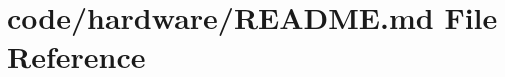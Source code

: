 \hypertarget{code_2hardware_2README_8md}{}\section{code/hardware/\+R\+E\+A\+D\+ME.md File Reference}
\label{code_2hardware_2README_8md}
